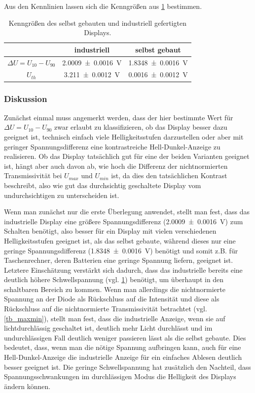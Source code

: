 \documentclass[
	a4paper,
	12pt,
	pagesize,
	ngerman
]{scrartcl}
\begin{document}
	Aus den Kennlinien lassen sich die Kenngrößen aus \cref{tb_kenngroessen} bestimmen.
	\begin{table}[H]
		\centering
		\begin{tabular}{ c | c | c }
			 & industriell & selbst gebaut \\ \hline
			$\Delta U=U_{10}-U_{90}$&\SI{2.0009+-0.0016}{V}&\SI{1.8348+-0.0016}{V} \\
			$U_{th}$ & \SI{3.211+-0.0012}{V} & \SI{0.0016+-0.0012}{V} \\
			\hline
		\end{tabular}
		\caption{Kenngrößen des selbst gebauten und industriell gefertigten Displays.}
		\label{tb_kenngroessen}
\end{table}

	\subsubsection{Diskussion}
	Zunächst einmal muss angemerkt werden, dass der hier bestimmte Wert für $\Delta U=U_{10}-U_{90}$ zwar erlaubt zu klassifizieren, ob das Display besser dazu geeignet ist, technisch einfach viele Helligkeitsstufen darzustellen oder aber mit geringer Spannungsdifferenz eine kontrastreiche Hell-Dunkel-Anzeige zu realisieren.
	Ob das Display tatsächlich gut für eine der beiden Varianten geeignet ist, hängt aber auch davon ab, wie hoch die Differenz der nichtnormierten Transmissivität bei $U_{max}$ und $U_{min}$ ist, da dies den tatsächlichen Kontrast beschreibt, also wie gut das durchsichtig geschaltete Display vom undurchsichtigen zu unterscheiden ist.

	Wenn man zunächst nur die erste Überlegung anwendet, stellt man fest, dass das industrielle Display eine größere Spannungsdifferenz (\SI{2.0009+-0.0016}{V}) zum Schalten benötigt, also besser für ein Display mit vielen verschiedenen Helligkeitsstufen geeignet ist, als das selbst gebaute, während dieses nur eine geringe Spannungsdifferenz (\SI{1.8348+-0.0016}{V}) benötigt und somit z.B. für Taschenrechner, deren Batterien eine geringe Spannung liefern, geeignet ist.
	Letztere Einschätzung verstärkt sich dadurch, dass das industrielle bereits eine deutlich höhere Schwellspannung (vgl. \cref{tb_kenngroessen}) benötigt, um überhaupt in den schaltbaren Bereich zu kommen.
	Wenn man allerdings die nichtnormierte Spannung an der Diode als Rückschluss auf die Intensität und diese als Rückschluss auf die nichtnormierte Transmissivität betrachtet (vgl. \cref{tb_maxmin}), stellt man fest, dass die industrielle Anzeige, wenn sie auf lichtdurchlässig geschaltet ist, deutlich mehr Licht durchlässt und im undurchlässigen Fall deutlich weniger passieren lässt als die selbst gebaute.
	Dies bedeutet, dass, wenn man die nötige Spannung aufbringen kann, auch für eine Hell-Dunkel-Anzeige die industrielle Anzeige für ein einfaches Ablesen deutlich besser geeignet ist.
	Die geringe Schwellspannung hat zusätzlich den Nachteil, dass  Spannungsschwankungen im durchlässigen Modus die Helligkeit des Displays ändern können.
\end{document}
